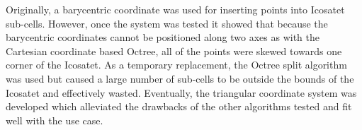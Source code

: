 \begin{table}[htp]
\caption{Icosatree Building Statistics}
\label{table:icosatreeStats}
\end{table}

Originally, a barycentric coordinate was used for inserting points into Icosatet
sub-cells. However, once the system was tested it showed that because the
barycentric coordinates cannot be positioned along two axes as with the
Cartesian coordinate based Octree, all of the points were skewed towards one
corner of the Icosatet. As a temporary replacement, the Octree split algorithm
was used but caused a large number of sub-cells to be outside the bounds of the
Icosatet and effectively wasted. Eventually, the triangular coordinate system
was developed which alleviated the drawbacks of the other algorithms tested and
fit well with the use case.

